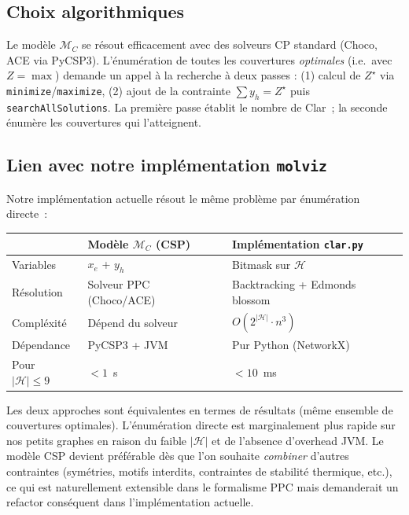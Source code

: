 \documentclass[a4paper,11pt]{article}
\begin{document}
\subsection*{Choix algorithmiques}

Le mod\`ele $\mathcal{M}_C$ se r\'esout efficacement avec des solveurs CP standard (Choco, ACE
via PyCSP3). L'\'enum\'eration de toutes les couvertures \emph{optimales} (i.e.\ avec
$Z = \max$) demande un appel \`a la recherche \`a deux passes : (1) calcul de $Z^\star$ via
\texttt{minimize}/\texttt{maximize}, (2) ajout de la contrainte $\sum y_h = Z^\star$ puis
\texttt{searchAllSolutions}. La premi\`ere passe \'etablit le nombre de Clar~; la seconde
\'enum\`ere les couvertures qui l'atteignent.

\subsection*{Lien avec notre impl\'ementation \texttt{molviz}}

Notre impl\'ementation actuelle r\'esout le m\^eme probl\`eme par \'enum\'eration directe~:

\begin{center}
\begin{tabular}{lll}
  \toprule
  & Mod\`ele $\mathcal{M}_C$ (CSP) & Impl\'ementation \texttt{clar.py} \\
  \midrule
  Variables & $x_e$ + $y_h$ & Bitmask sur $\mathcal{H}$ \\
  R\'esolution & Solveur PPC (Choco/ACE) & Backtracking + Edmonds blossom \\
  Compl\'exit\'e & D\'epend du solveur & $O(2^{|\mathcal{H}|} \cdot n^3)$ \\
  D\'ependance & PyCSP3 + JVM & Pur Python (NetworkX) \\
  Pour $|\mathcal{H}| \leq 9$ & $<1$~s & $<10$~ms \\
  \bottomrule
\end{tabular}
\end{center}

\noindent Les deux approches sont \'equivalentes en termes de r\'esultats (m\^eme ensemble de
couvertures optimales). L'\'enum\'eration directe est marginalement plus rapide sur nos petits
graphes en raison du faible $|\mathcal{H}|$ et de l'absence d'overhead JVM. Le mod\`ele CSP
devient pr\'ef\'erable d\`es que l'on souhaite \emph{combiner} d'autres contraintes
(sym\'etries, motifs interdits, contraintes de stabilit\'e thermique, etc.), ce qui est
naturellement extensible dans le formalisme PPC mais demanderait un refactor cons\'equent dans
l'impl\'ementation actuelle.
\end{document}
